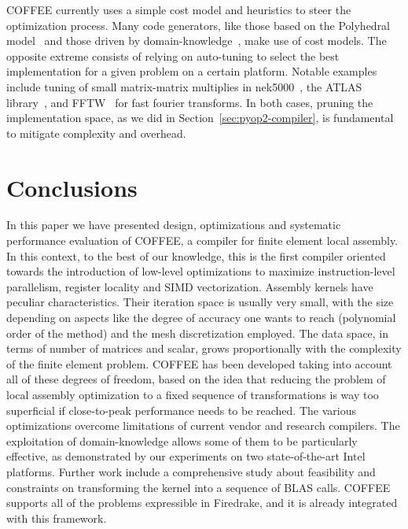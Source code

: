 \documentclass[conference]{IEEEtran}
\begin{document}
COFFEE currently uses a simple cost model and heuristics to steer the optimization process. Many code generators, like those based on the Polyhedral model~\cite{PLUTO} and those driven by domain-knowledge~\cite{modeldriven}, make use of cost models. The opposite extreme consists of relying on auto-tuning to select the best implementation for a given problem on a certain platform. Notable examples include tuning of small matrix-matrix multiplies in nek5000~\cite{nek5000}, the ATLAS library~\cite{ATLAS}, and FFTW~\cite{FFTW} for fast fourier transforms. In both cases, pruning the implementation space, as we did in Section~\ref{sec:pyop2-compiler}, is fundamental to mitigate complexity and overhead.




\section{Conclusions}
\label{sec:conclusions}

In this paper we have presented design, optimizations and systematic performance evaluation of COFFEE, a compiler for finite element local assembly. In this context, to the best of our knowledge, this is the first compiler oriented towards the introduction of low-level optimizations to maximize instruction-level parallelism, register locality and SIMD vectorization. Assembly kernels have peculiar characteristics. Their iteration space is usually very small, with the size depending on aspects like the degree of accuracy one wants to reach (polynomial order of the method) and the mesh discretization employed. The data space, in terms of number of matrices and scalar, grows proportionally with the complexity of the finite element problem. COFFEE has been developed taking into account all of these degrees of freedom, based on the idea that reducing the problem of local assembly optimization to a fixed sequence of transformations is way too superficial if close-to-peak performance needs to be reached. The various optimizations overcome limitations of current vendor and research compilers. The exploitation of domain-knowledge allows some of them to be particularly effective, as demonstrated by our experiments on two state-of-the-art Intel platforms. Further work include a comprehensive study about feasibility and constraints on transforming the kernel into a sequence of BLAS calls. COFFEE supports all of the problems expressible in Firedrake, and it is already integrated with this framework.
\end{document}
